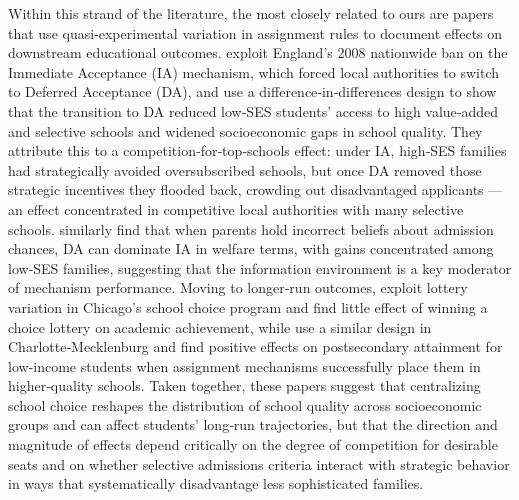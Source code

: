 Within this strand of the literature, the most closely related to ours are papers that use quasi‑experimental variation in assignment rules to document effects on downstream educational outcomes. \citet{terrier2024} exploit England's 2008 nationwide ban on the Immediate Acceptance (IA) mechanism, which forced local authorities to switch to Deferred Acceptance (DA), and use a difference‑in‑differences design to show that the transition to DA reduced low‑SES students' access to high value‑added and selective schools and widened socioeconomic gaps in school quality. They attribute this to a competition‑for‑top‑schools effect: under IA, high‑SES families had strategically avoided oversubscribed schools, but once DA removed those strategic incentives they flooded back, crowding out disadvantaged applicants — an effect concentrated in competitive local authorities with many selective schools. \citet{kaporneilsonzimmerman2020} similarly find that when parents hold incorrect beliefs about admission chances, DA can dominate IA in welfare terms, with gains concentrated among low‑SES families, suggesting that the information environment is a key moderator of mechanism performance. Moving to longer‑run outcomes, \citet{cullenjacobleviit2006} exploit lottery variation in Chicago's school choice program and find little effect of winning a choice lottery on academic achievement, while \citet{demingetal2014} use a similar design in Charlotte‑Mecklenburg and find positive effects on postsecondary attainment for low‑income students when assignment mechanisms successfully place them in higher‑quality schools. Taken together, these papers suggest that centralizing school choice reshapes the distribution of school quality across socioeconomic groups and can affect students' long‑run trajectories, but that the direction and magnitude of effects depend critically on the degree of competition for desirable seats and on whether selective admissions criteria interact with strategic behavior in ways that systematically disadvantage less sophisticated families.









